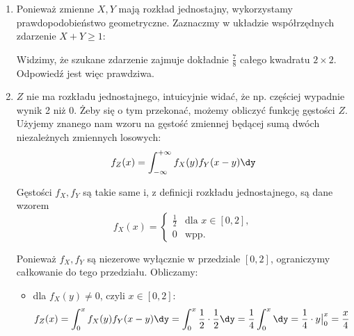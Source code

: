 \begin{solutions}
    \begin{enumerate}[\bf A.]
        \item Ponieważ zmienne $X, Y$ mają rozkład jednostajny, wykorzystamy prawdopodobieństwo geometryczne. Zaznaczmy w układzie współrzędnych zdarzenie $X + Y \geq 1$:

        \begin{center}
        \end{center}

        Widzimy, że szukane zdarzenie zajmuje dokładnie $\frac{7}{8}$ całego kwadratu $2 \times 2$. Odpowiedź jest więc prawdziwa.

        \item $Z$ nie ma rozkładu jednostajnego, intuicyjnie widać, że np. częściej wypadnie wynik 2 niż 0. Żeby się o tym przekonać, możemy obliczyć funkcję gęstości $Z$. Użyjemy znanego nam wzoru na gęstość zmiennej będącej sumą dwóch niezależnych zmiennych losowych:
        $$f_Z(x) = \int_{-\infty}^{+\infty} f_X(y) f_Y(x - y) \dy$$

        Gęstości $f_X, f_Y$ są takie same i, z definicji rozkładu jednostajnego, są dane wzorem
        $$
        f_X(x) = \begin{cases} 
            \frac{1}{2} & \text{dla } x \in [0, 2], \\
            0 & \text{wpp.}
        \end{cases}
        $$

        Ponieważ $f_X, f_Y$ są niezerowe wyłącznie w przedziale $[0, 2]$, ograniczymy całkowanie do tego przedziału. Obliczamy:
        \begin{itemize}
            \item dla $f_X(y) \neq 0$, czyli $x \in [0, 2]$:
            $$f_Z(x) = \int_{0}^{x} f_X(y) f_Y(x - y) \dy = \int_{0}^{x} \frac{1}{2} \cdot \frac{1}{2} \dy = \frac{1}{4} \int_{0}^{x} \dy = \frac{1}{4} \cdot y \big|_0^x = \frac{x}{4}$$


\end{itemize}
\end{enumerate}
\end{solutions}
